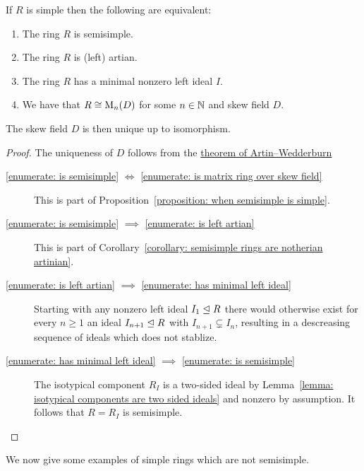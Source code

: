 \begin{theorem}[Wedderburn]
  \label{theorem: wedderburns theorem}
  If $R$ is simple then the following are equivalent:
  \begin{enumerate}
    \item
      \label{enumerate: is semisimple}
      The ring $R$ is semisimple.
    \item 
      \label{enumerate: is left artian}
      The ring $R$ is (left) artian.
    \item
      \label{enumerate: has minimal left ideal}
      The ring $R$ has a minimal nonzero left ideal $I$.
    \item
      \label{enumerate: is matrix ring over skew field}
      We have that $R \cong \operatorname{M}_n(D)$ for some $n \in \mathbb{N}$ and skew field $D$.
  \end{enumerate}
  The skew field $D$ is then unique up to isomorphism.
\end{theorem}


\begin{proof}
  The uniqueness of $D$ follows from the \hyperref[theorem: artin wedderburn theorem]{theorem of Artin--Wedderburn}
  \begin{description}
    \item[\ref*{enumerate: is semisimple} $\iff$ \ref*{enumerate: is matrix ring over skew field}]
      This is part of Proposition~\ref{proposition: when semisimple is simple}.
    \item[\ref*{enumerate: is semisimple} $\implies$ \ref*{enumerate: is left artian}]
      This is part of Corollary~\ref{corollary: semisimple rings are notherian artinian}.
    \item[\ref*{enumerate: is left artian} $\implies$ \ref*{enumerate: has minimal left ideal}]
      Starting with any nonzero left ideal $I_1 \trianglelefteq R$ there would otherwise exist for every $n \geq 1$ an ideal $I_{n+1} \trianglelefteq R$ with $I_{n+1} \subsetneq I_n$, resulting in a descreasing sequence of ideals which does not stablize.
    \item[\ref*{enumerate: has minimal left ideal} $\implies$ \ref*{enumerate: is semisimple}]
      The isotypical component $R_I$ is a two-sided ideal by Lemma~\ref{lemma: isotypical components are two sided ideals} and nonzero by assumption.
      It follows that $R = R_I$ is semisimple.
    \qedhere
  \end{description}
\end{proof}


\begin{fluff}
  We now give some examples of simple rings which are not semisimple.
\end{fluff}


